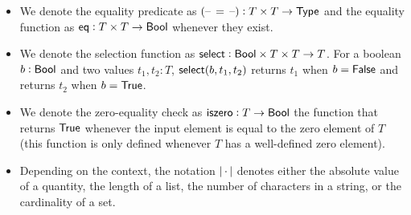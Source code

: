 \begin{itemize}
    \item We denote the equality predicate as $({\textrm{--}}\,=\,{\textrm{--}}) : T \times T \to {\textsf{Type}}$ and the equality function as ${\textsf{eq}} : T \times T \to {\textsf{Bool}}$ whenever they exist.
    \item We denote the selection function as ${\textsf{select}}: {\textsf{Bool}} \times T \times T \to T$. For a boolean $b: {\textsf{Bool}}$ and two values $t_1, t_2 : T$, ${\textsf{select}}(b, t_1, t_2)$ returns $t_1$ when $b = {\textsf{False}}$ and returns $t_2$ when $b = {\textsf{True}}$.
    \item We denote the zero-equality check as ${\textsf{iszero}} : T \to {\textsf{Bool}}$ the function that returns ${\textsf{True}}$ whenever the input element is equal to the zero element of $T$ (this function is only defined whenever $T$ has a well-defined zero element).
    \item Depending on the context, the notation $\left|\,\cdot\,\right|$ denotes either the absolute value of a quantity, the length of a list, the number of characters in a string, or the cardinality of a set.
\end{itemize}

